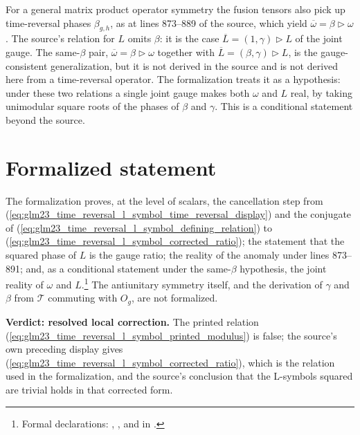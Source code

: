 \documentclass{article}
\begin{document}
For a general matrix product operator symmetry the fusion tensors also pick
up time-reversal phases $\beta_{g,h}$, as at lines 873--889 of the source,
which yield $\overline\omega=\beta\mathbin{\triangleright}\omega$. The
source's relation for $L$ omits $\beta$: it is the case
$\overline L=(1,\gamma)\mathbin{\triangleright}L$ of the joint gauge. The
same-$\beta$ pair, $\overline\omega=\beta\mathbin{\triangleright}\omega$
together with $\overline L=(\beta,\gamma)\mathbin{\triangleright}L$, is the
gauge-consistent generalization, but it is not derived in the source and is
not derived here from a time-reversal operator. The formalization treats it
as a hypothesis: under these two relations a single joint gauge makes both
$\omega$ and $L$ real, by taking unimodular square roots of the phases of
$\beta$ and $\gamma$. This is a conditional statement beyond the source.

\section{Formalized statement}

The formalization proves, at the level of scalars, the cancellation step
from (\ref{eq:glm23_time_reversal_l_symbol_time_reversal_display}) and the conjugate of (\ref{eq:glm23_time_reversal_l_symbol_defining_relation}) to
(\ref{eq:glm23_time_reversal_l_symbol_corrected_ratio}); the statement that the squared phase of $L$ is the
gauge ratio; the reality of the anomaly under lines 873--891; and, as a
conditional statement under the same-$\beta$ hypothesis, the joint reality
of $\omega$ and $L$.\footnote{Formal declarations:
,
,
and  in
.}
The antiunitary symmetry itself, and the derivation of $\gamma$ and $\beta$
from $\mathcal T$ commuting with $O_g$, are not formalized.

\textbf{Verdict: resolved local correction.} The printed
relation (\ref{eq:glm23_time_reversal_l_symbol_printed_modulus}) is false; the source's own preceding display gives
(\ref{eq:glm23_time_reversal_l_symbol_corrected_ratio}), which is the relation used in the formalization, and
the source's conclusion that the L-symbols squared are trivial holds in
that corrected form.



\end{document}
